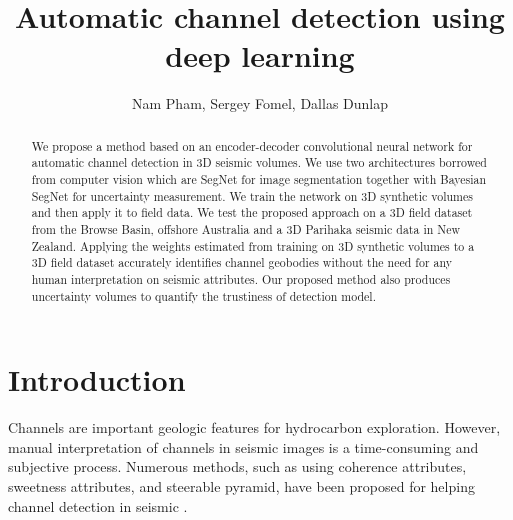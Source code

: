 
\title{Automatic channel detection using deep learning}
\author{Nam Pham, Sergey Fomel, Dallas Dunlap}
\address{The University of Texas at Austin,\\
John A. and Katherine G. Jackson School of Geosciences,\\ Bureau of Economic Geology,\\
Austin, Texas, USA}




\maketitle
\begin{abstract}
We propose a method based on an encoder-decoder convolutional neural network for automatic channel detection in 3D seismic volumes. We use two architectures borrowed from computer vision which are SegNet for image segmentation together with Bayesian SegNet for uncertainty measurement. We train the network on 3D synthetic volumes and then apply it to field data. We test the proposed approach on a 3D field dataset from the Browse Basin, offshore Australia and a 3D Parihaka seismic data in New Zealand. Applying the weights estimated from training on 3D synthetic volumes to a 3D field dataset accurately identifies channel geobodies without the need for any human interpretation on seismic attributes. Our proposed method also produces uncertainty volumes to quantify the trustiness of detection model.  
\end{abstract}

\section{Introduction}
Channels are important geologic features for hydrocarbon exploration. However, manual interpretation of channels in seismic images is a time-consuming and subjective process. Numerous methods, such as using coherence attributes, sweetness attributes, and steerable pyramid, have been proposed for helping channel detection in seismic \cite[]{coherence, sweetness, pyramid}. 

